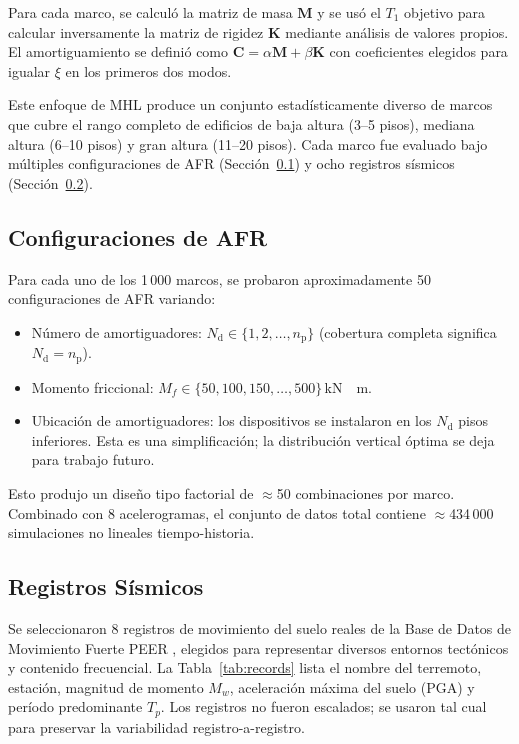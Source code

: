 \documentclass[preprint,12pt,authoryear]{elsarticle}
\newcommand{\nd}{N_{\mathrm{d}}}
\newcommand{\np}{n_{\mathrm{p}}}
\newcommand{\Mf}{M_{\!f}}
\newcommand{\KM}{\,\si{kN{\cdot}m}}
\begin{document}
Para cada marco, se calculó la matriz de masa $\mathbf{M}$ y se usó el $T_1$ objetivo para 
calcular inversamente la matriz de rigidez $\mathbf{K}$ mediante análisis de valores propios. 
El amortiguamiento se definió como $\mathbf{C} = \alpha\mathbf{M} + \beta\mathbf{K}$ con 
coeficientes elegidos para igualar $\xi$ en los primeros dos modos.

Este enfoque de MHL produce un conjunto estadísticamente diverso de marcos que cubre el rango 
completo de edificios de baja altura (3--5 pisos), mediana altura (6--10 pisos) y gran altura 
(11--20 pisos). Cada marco fue evaluado bajo múltiples configuraciones de AFR 
(Sección~\ref{sec:rfd_configs}) y ocho registros sísmicos (Sección~\ref{sec:seismic_records}).

\subsection{Configuraciones de AFR}
\label{sec:rfd_configs}

Para cada uno de los 1\,000 marcos, se probaron aproximadamente 50 configuraciones de AFR 
variando:

\begin{itemize}[leftmargin=1.5em]
  \item Número de amortiguadores: $\nd \in \{1, 2, \ldots, \np\}$ (cobertura completa 
        significa $\nd = \np$).
  \item Momento friccional: $\Mf \in \{50, 100, 150, \ldots, 500\}$\KM.
  \item Ubicación de amortiguadores: los dispositivos se instalaron en los $\nd$ pisos 
        inferiores. Esta es una simplificación; la distribución vertical óptima se deja 
        para trabajo futuro.
\end{itemize}

Esto produjo un diseño tipo factorial de $\approx$50 combinaciones por marco. Combinado con 
8 acelerogramas, el conjunto de datos total contiene $\approx$434\,000 simulaciones no lineales 
tiempo-historia.

\subsection{Registros Sísmicos}
\label{sec:seismic_records}

Se seleccionaron 8 registros de movimiento del suelo reales de la Base de Datos de Movimiento 
Fuerte PEER \citep{ancheta_peer_2014}, elegidos para representar diversos entornos tectónicos 
y contenido frecuencial. La Tabla~\ref{tab:records} lista el nombre del terremoto, estación, 
magnitud de momento $M_w$, aceleración máxima del suelo (PGA) y período predominante $T_p$. 
Los registros no fueron escalados; se usaron tal cual para preservar la variabilidad 
registro-a-registro.
\end{document}
